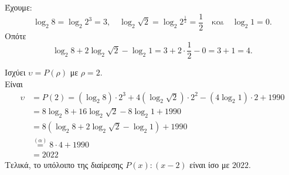 \begin{alist}
\item Έχουμε:
\[\log_2 8 = \log_2 2^3 = 3, \quad \log_2 \sqrt{2} = \log_2 2^{\frac{1}{2}} = \frac{1}{2} \quad \text{και} \quad \log_2 1 = 0.\]
Οπότε
\[\log_2 8 + 2\log_2 \sqrt{2} - \log_2 1 = 3 + 2 \cdot \frac{1}{2} - 0 = 3 + 1 = 4.\]
\item Ισχύει $\upsilon = P(\rho)$ με $\rho = 2$. \\
Είναι
\begin{align*}
\upsilon &= P(2) = (\log_2 8) \cdot 2^3 + 4(\log_2 \sqrt{2}) \cdot 2^2 - (4\log_2 1) \cdot 2 + 1990 \\
&= 8\log_2 8 + 16\log_2 \sqrt{2} - 8\log_2 1 + 1990 \\
&= 8(\log_2 8 + 2\log_2 \sqrt{2} - \log_2 1) + 1990 \\
&\overset{(\alpha)}{=} 8 \cdot 4 + 1990 \\
&= 2022
\end{align*}
Τελικά, το υπόλοιπο της διαίρεσης $P(x) : (x-2)$ είναι ίσο με $2022$.
\end{alist}

